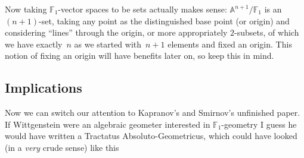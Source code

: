 Now taking $\mathbb{F}_1$-vector spaces to be sets actually makes sense: $\mathbb{A}^{n+1}/\mathbb{F}_1$ is an~$(n+1)$-set, taking any point as the distinguished base point (or origin) and considering ``lines'' through the origin, or more appropriately $2$-subsets, of which we have exactly~$n$ as we started with~$n+1$ elements and fixed an origin. This notion of fixing an origin will have benefits later on, so keep this in mind.

\subsection{Implications}

Now we can switch our attention to \iftex\cite{kapranov-smirnov}\fi\ifblog Kapranov's and Smirnov's unfinished paper\fi. If Wittgenstein were an algebraic geometer interested in $\mathbb{F}_1$-geometry I guess he would have written a Tractatus Absoluto-Geometricus, which could have looked (in a \emph{very} crude sense) like this
